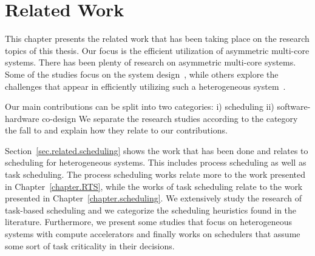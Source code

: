 \chapter{Related Work}
\label{chapter.related}
This chapter presents the related work that has been taking place on the research topics of this thesis.
Our focus is the efficient utilization of asymmetric multi-core systems.
There has been plenty of research on asymmetric multi-core systems. 
Some of the studies focus on the system design~\cite{Kumar_micro_2003,Balakrishnan:ISCA2005, Morad_area_based}, while others explore the challenges that appear in efficiently utilizing such a heterogeneous system~\cite{Kumar:ISCA2004,Joao:ASPLOS2012,Joao:ISCA2013}.


Our main contributions can be split into two categories:
i) scheduling 
ii) software-hardware co-design
We separate the research studies according to the category the fall to and explain how they relate to our contributions.

Section~\ref{sec.related.scheduling} shows the work that has been done and relates to scheduling for heterogeneous systems.
This includes process scheduling as well as task scheduling. 
The process scheduling works relate more to the work presented in Chapter~\ref{chapter.RTS}, while the works of task scheduling relate to the work presented in Chapter~\ref{chapter.scheduling}.
We extensively study the research of task-based scheduling and we categorize the scheduling heuristics found in the literature. 
Furthermore, we present some studies that focus on heterogeneous systems with compute accelerators and finally works on schedulers that assume some sort of task criticality in their decisions.

